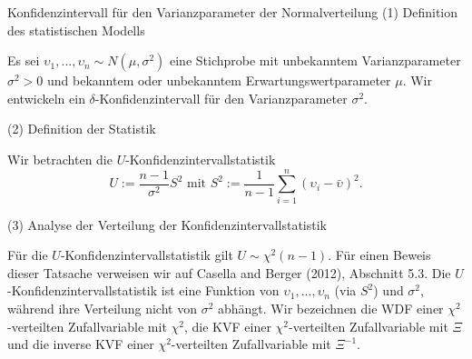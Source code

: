 \documentclass[
  8pt,
  ignorenonframetext,
]{beamer}
\newcommand{\ups} {\upsilon}
\begin{document}
\begin{frame}{Konfidenzintervall für den Varianzparameter der
Normalverteilung}
\protect\hypertarget{konfidenzintervall-fuxfcr-den-varianzparameter-der-normalverteilung}{}
\noindent (1) Definition des statistischen Modells

\small

Es sei \(\ups_1,...,\ups_n \sim N(\mu,\sigma^2)\) eine Stichprobe mit
unbekanntem Varianzparameter \(\sigma^2 > 0\) und bekanntem oder
unbekanntem Erwartungswertparameter \(\mu\). Wir entwickeln ein
\(\delta\)-Konfidenzintervall für den Varianzparameter \(\sigma^2\).

\normalsize

\noindent (2) Definition der Statistik

\small

Wir betrachten die \(U\)-Konfidenzintervallstatistik \begin{equation}
U := \frac{n-1}{\sigma^2}S^2 \mbox{ mit } S^2 := \frac{1}{n-1}\sum_{i=1}^n \left(\ups_i - \bar{\ups}\right)^2.
\end{equation}

\normalsize

\noindent (3) Analyse der Verteilung der Konfidenzintervallstatistik

\small

Für die \(U\)-Konfidenzintervallstatistik gilt \(U \sim \chi^2(n-1)\).
Für einen Beweis dieser Tatsache verweisen wir auf Casella and Berger
(2012), Abschnitt 5.3. Die \(U\)-Konfidenzintervallstatistik ist eine
Funktion von \(\ups_1,...,\ups_n\) (via \(S^2\)) und \(\sigma^2\),
während ihre Verteilung nicht von \(\sigma^2\) abhängt. Wir bezeichnen
die WDF einer \(\chi^2\)-verteilten Zufallvariable mit \(\chi^2\), die
KVF einer \(\chi^2\)-verteilten Zufallvariable mit \(\Xi\) und die
inverse KVF einer \(\chi^2\)-verteilten Zufallvariable mit \(\Xi^{-1}\).
\end{frame}
\end{document}
